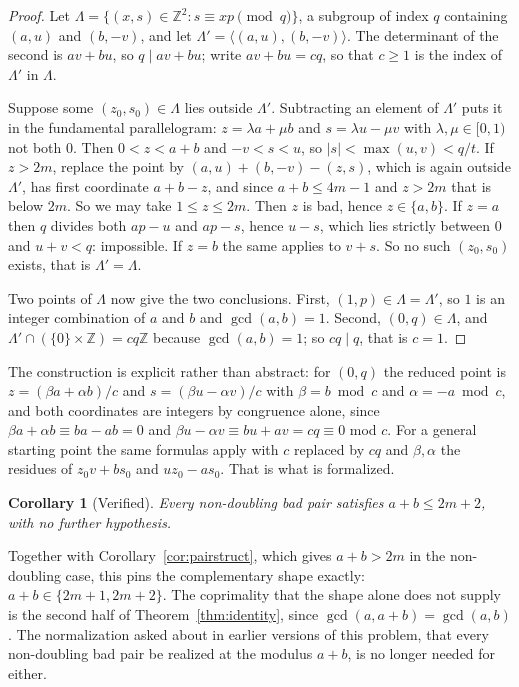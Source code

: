 \documentclass[11pt]{amsart}
\theoremstyle{plain}
\newtheorem{corollary}[theorem]{Corollary}
\theoremstyle{definition}
\begin{document}
\begin{proof}
Let $\Lambda = \{(x,s) \in \mathbb{Z}^2 : s \equiv xp \pmod q\}$, a subgroup of index $q$
containing $(a,u)$ and $(b,-v)$, and let $\Lambda' = \langle (a,u),(b,-v)\rangle$. The determinant
of the second is $av+bu$, so $q \mid av+bu$; write $av + bu = cq$, so that $c \ge 1$ is the index of
$\Lambda'$ in $\Lambda$.

Suppose some $(z_0,s_0) \in \Lambda$ lies outside $\Lambda'$. Subtracting an element of $\Lambda'$
puts it in the fundamental parallelogram: $z = \lambda a + \mu b$ and $s = \lambda u - \mu v$ with
$\lambda, \mu \in [0,1)$ not both $0$. Then $0 < z < a+b$ and $-v < s < u$, so
$|s| < \max(u,v) < q/t$. If $z > 2m$, replace the point by $(a,u)+(b,-v)-(z,s)$, which is again
outside $\Lambda'$, has first coordinate $a+b-z$, and since $a+b \le 4m-1$ and $z > 2m$ that is
below $2m$. So we may take $1 \le z \le 2m$. Then $z$ is bad, hence $z \in \{a,b\}$. If $z = a$
then $q$ divides both $ap-u$ and $ap-s$, hence $u-s$, which lies strictly between $0$ and
$u+v < q$: impossible. If $z = b$ the same applies to $v+s$. So no such $(z_0,s_0)$ exists, that is
$\Lambda' = \Lambda$.

Two points of $\Lambda$ now give the two conclusions. First, $(1,p) \in \Lambda = \Lambda'$, so
$1$ is an integer combination of $a$ and $b$ and $\gcd(a,b) = 1$. Second, $(0,q) \in \Lambda$, and
$\Lambda' \cap (\{0\}\times\mathbb{Z}) = cq\mathbb{Z}$ because $\gcd(a,b)=1$; so $cq \mid q$,
that is $c = 1$.
\end{proof}

The construction is explicit rather than abstract: for $(0,q)$ the reduced point is
$z = (\beta a + \alpha b)/c$ and $s = (\beta u - \alpha v)/c$ with $\beta = b \bmod c$ and
$\alpha = -a \bmod c$, and both coordinates are integers by congruence alone, since
$\beta a + \alpha b \equiv ba-ab = 0$ and $\beta u - \alpha v \equiv bu+av = cq \equiv 0$ mod
$c$. For a general starting point the same formulas apply with $c$ replaced by $cq$ and
$\beta, \alpha$ the residues of $z_0v + bs_0$ and $uz_0 - as_0$. That is what is formalized.

\begin{corollary}[Verified]\label{cor:pairupper-uncond}
Every non-doubling bad pair satisfies $a+b \le 2m+2$, with no further hypothesis.
\end{corollary}

Together with Corollary~\ref{cor:pairstruct}, which gives $a+b > 2m$ in the non-doubling case, this
pins the complementary shape exactly: $a+b \in \{2m+1, 2m+2\}$. The coprimality that the shape
alone does not supply is the second half of Theorem~\ref{thm:identity}, since
$\gcd(a,a+b) = \gcd(a,b)$. The normalization asked about in earlier versions of this problem, that
every non-doubling bad pair be realized at the modulus $a+b$, is no longer needed for either.
\end{document}
